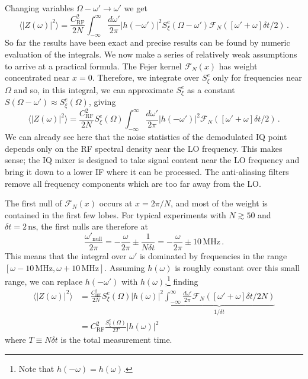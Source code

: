 Changing variables $\Omega - \omega' \rightarrow \omega'$ we get
\begin{equation}
  \langle |Z(\omega)|^2 \rangle =
  \frac{C_\text{RF}^2}{2N} \int_{-\infty}^\infty \frac{d\omega'}{2\pi}
  |h(-\omega')|^2 S^e_\xi(\Omega - \omega')
  \mathcal{F}_N([\omega' + \omega]\delta t / 2) \, .
\end{equation}
So far the results have been exact and precise results can be found by numeric evaluation of the integrals.
We now make a series of relatively weak assumptions to arrive at a practical formula.
The Fejer kernel $\mathcal{F}_N(x)$ has weight concentrated near $x=0$.
Therefore, we integrate over $S^e_\xi$ only for frequencies near $\Omega$ and so, in this integral, we can approximate $S^e_\xi$ as a constant $S(\Omega - \omega') \approx S^e_\xi(\Omega)$, giving
\begin{equation}
\langle |Z(\omega)|^2 \rangle =
  \frac{C_\text{RF}^2}{2N} S^e_\xi(\Omega) \int_{-\infty}^\infty \frac{d\omega'}{2\pi} |h(-\omega')|^2 \mathcal{F}_N([\omega' + \omega]\delta t / 2) \, .
\end{equation}
We can already see here that the noise statistics of the demodulated IQ point depends only on the RF spectral density near the LO frequency.
This makes sense; the IQ mixer is designed to take signal content near the LO frequency and bring it down to a lower IF where it can be processed.
The anti-aliasing filters remove all frequency components which are too far away from the LO.

The first null of $\mathcal{F}_N(x)$ occurs at $x = 2\pi / N$, and most of the weight is contained in the first few lobes.
For typical experiments with $N \gtrsim 50$ and $\delta t = 2 \, \text{ns}$, the first nulls are therefore at
\begin{equation}
\frac{\omega'_{\text{null}}}{2\pi}
= - \frac{\omega}{2\pi} \pm \frac{1}{N \delta t}
= - \frac{\omega}{2\pi} \pm 10 \, \text{MHz} \, .
\end{equation}
This means that the integral over $\omega'$ is dominated by frequencies in the range $[\omega - 10\,\text{MHz}, \omega + 10 \, \text{MHz}]$.
Assuming $h(\omega)$ is roughly constant over this small range, we can replace $h(-\omega')$ with $h(\omega)$,\footnote{Note that $h(-\omega) = h(\omega)$.} finding
\begin{align}
  \langle |Z(\omega)|^2 \rangle
  &= \frac{C_\text{RF}^2}{2N}S^e_\xi(\Omega)|h(\omega)|^2
  \underbrace{
  \int_{-\infty}^\infty \frac{d\omega'}{2\pi} \mathcal{F}_N([\omega' + \omega] \delta t / 2 N)
  }_{1 / \delta t} \\
  &= C_\text{RF}^2 \frac{S^e_\xi(\Omega)}{2 T} |h(\omega)|^2
\end{align}
where $T \equiv N \delta t$ is the total measurement time.

